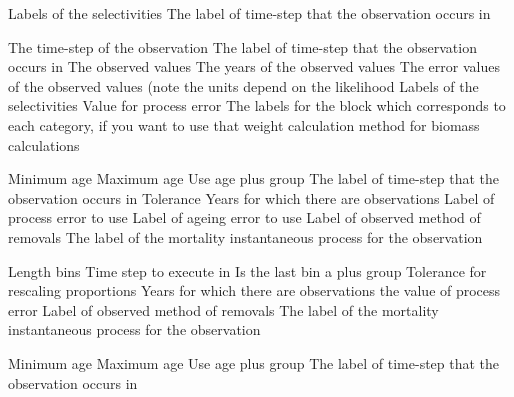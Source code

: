  {Labels of the selectivities}
 {The label of time-step that the observation occurs in}
\par\textbf{}\par
{} {The time-step of the observation}
 {The label of time-step that the observation occurs in}
 {The observed values}
 {The years of the observed values}
 {The error values of the observed values (note the units depend on the likelihood}
 {Labels of the selectivities}
 {Value for process error}
 {The labels for the  block which corresponds to each category, if you want to use that weight calculation method for biomass calculations}
\par\textbf{}\par
{} {Minimum age}
 {Maximum age}
 {Use age plus group}
 {The label of time-step that the observation occurs in}
 {Tolerance}
 {Years for which there are observations}
 {Label of process error to use}
 {Label of ageing error to use}
 {Label of observed method of removals}
 {The label of the mortality instantaneous process for the observation}
\par\textbf{}\par
{} {Length bins}
 {Time step to execute in}
 {Is the last bin a plus group}
 {Tolerance for rescaling proportions}
 {Years for which there are observations}
 {the value of process error}
 {Label of observed method of removals}
 {The label of the mortality instantaneous process for the observation}
\par\textbf{}\par
{} {Minimum age}
 {Maximum age}
 {Use age plus group}
 {The label of time-step that the observation occurs in}
